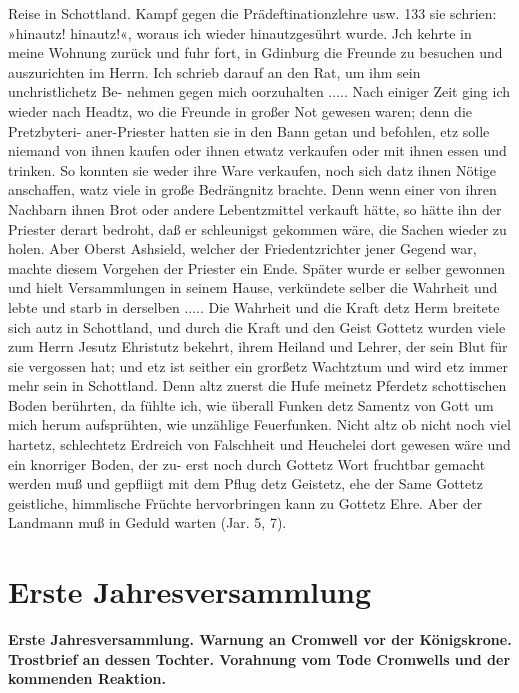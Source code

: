 Reise in Schottland. Kampf gegen die Prädeftinationzlehre usw. 133
sie schrien: »hinautz! hinautz!«, woraus ich wieder hinautzgesührt
wurde. Jch kehrte in meine Wohnung zurück und fuhr fort, in
Gdinburg die Freunde zu besuchen und auszurichten im Herrn.
Ich schrieb darauf an den Rat, um ihm sein unchristlichetz Be-
nehmen gegen mich oorzuhalten .....
Nach einiger Zeit ging ich wieder nach Headtz, wo die
Freunde in großer Not gewesen waren; denn die Pretzbyteri-
aner-Priester hatten sie in den Bann getan und befohlen,
etz solle niemand von ihnen kaufen oder ihnen etwatz
verkaufen oder mit ihnen essen und trinken. So konnten sie weder
ihre Ware verkaufen, noch sich datz ihnen Nötige anschaffen, watz
viele in große Bedrängnitz brachte. Denn wenn einer von ihren
Nachbarn ihnen Brot oder andere Lebentzmittel verkauft hätte, so
hätte ihn der Priester derart bedroht, daß er schleunigst gekommen
wäre, die Sachen wieder zu holen. Aber Oberst Ashsield, welcher
der Friedentzrichter jener Gegend war, machte diesem Vorgehen
der Priester ein Ende. Später wurde er selber gewonnen und hielt
Versammlungen in seinem Hause, verkündete selber die Wahrheit
und lebte und starb in derselben .....
Die Wahrheit und die Kraft detz Herm breitete sich autz in
Schottland, und durch die Kraft und den Geist Gottetz wurden
viele zum Herrn Jesutz Ehristutz bekehrt, ihrem Heiland und Lehrer,
der sein Blut für sie vergossen hat; und etz ist seither ein grorßetz
Wachtztum und wird etz immer mehr sein in Schottland. Denn
altz zuerst die Hufe meinetz Pferdetz schottischen Boden berührten,
da fühlte ich, wie überall Funken detz Samentz von Gott um mich
herum aufsprühten, wie unzählige Feuerfunken. Nicht altz ob
nicht noch viel hartetz, schlechtetz Erdreich von Falschheit und
Heuchelei dort gewesen wäre und ein knorriger Boden, der zu-
erst noch durch Gottetz Wort fruchtbar gemacht werden muß
und gepfliigt mit dem Pflug detz Geistetz, ehe der Same Gottetz
geistliche, himmlische Früchte hervorbringen kann zu Gottetz Ehre.
Aber der Landmann muß in Geduld warten (Jar. 5, 7).



\chapter[Erste Jahresversammlung]{Erste Jahresversammlung}

\begin{center}
\textbf{Erste Jahresversammlung. Warnung an Cromwell vor 
der Königskrone. Trostbrief an dessen Tochter. Vorahnung 
vom Tode Cromwells und der kommenden Reaktion.}
\end{center}


